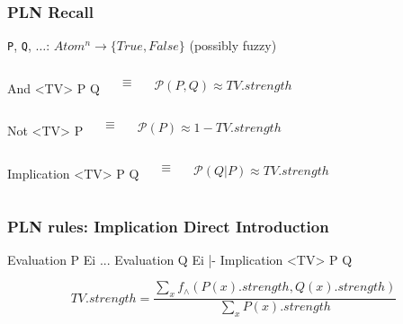 \documentclass[aspectratio=169]{beamer}
\begin{document}
\begin{frame}[fragile]
  \frametitle{PLN Recall}

\texttt{P}, \texttt{Q}, $\hdots$: $Atom^n \rightarrow \{True, False\}$
{\tiny \alert{(possibly fuzzy)}}

  \begin{columns}
    \column{1in}

\begin{semiverbatim}
  And <TV>
    P
    Q
\end{semiverbatim}

    \column{0.5in}
    $$\equiv$$

    \column{1in}
    $$\mathcal{P}(P,Q) \approx TV.strength$$

  \end{columns}

  \begin{columns}
    \column{1in}

\begin{semiverbatim}
  Not <TV>
    P
\end{semiverbatim}

    \column{0.5in}
    $$\equiv$$

    \column{1in}
    $$\mathcal{P}(P) \approx 1 - TV.strength$$

  \end{columns}

  \begin{columns}
    \column{1in}

\begin{semiverbatim}
  Implication <TV>
    P
    Q
\end{semiverbatim}

    \column{0.5in}
    $$\equiv$$

    \column{1in}
    $$\mathcal{P}(Q|P) \approx TV.strength$$

  \end{columns}

\end{frame}

\begin{frame}[fragile]

  \frametitle{PLN rules: Implication Direct Introduction}
\begin{semiverbatim}
Evaluation
  P
  Ei
...
Evaluation
  Q
  Ei
|-
Implication <TV>
  P
  Q
\end{semiverbatim}



$$TV.strength = \frac{\sum_x f_\wedge(P(x).strength, Q(x).strength)}{\sum_x P(x).strength}$$
\end{frame}
\end{document}
